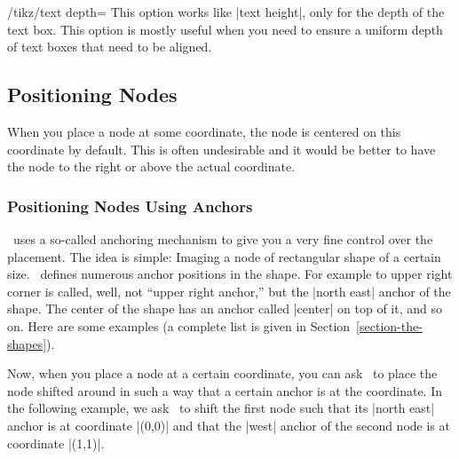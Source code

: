 \begin{key}{/tikz/text depth=}
  This option works like |text height|, only for the depth of the text
  box. This option is mostly useful when you need to ensure a uniform
  depth of text boxes that need to be aligned.
\end{key}



\subsection{Positioning Nodes}

\label{section-nodes-anchors}

When you place a node at some coordinate, the node is centered on this
coordinate by default. This is often undesirable and it would be
better to have the node to the right or above the actual coordinate.


\subsubsection{Positioning Nodes Using Anchors}

\pgfname\ uses a so-called anchoring mechanism to give you a very fine
control over the placement. The idea is simple: Imaging a node of
rectangular shape of a certain size. \pgfname\ defines numerous anchor
positions in the shape. For example to upper right corner is called,
well, not ``upper right anchor,'' but the |north east| anchor of the
shape. The center of the shape has an anchor called |center| on top of
it, and so on. Here are some examples (a complete list is given in
Section~\ref{section-the-shapes}).

\medskip\noindent
{}

Now, when you place a node at a certain coordinate, you can ask \tikzname\
to place the node shifted around in such a way that a certain
anchor is at the coordinate. In the following example, we ask \tikzname\
to shift the first node such that its  |north east| anchor is at
coordinate |(0,0)| and that the |west| anchor of the second node is at
coordinate |(1,1)|.

